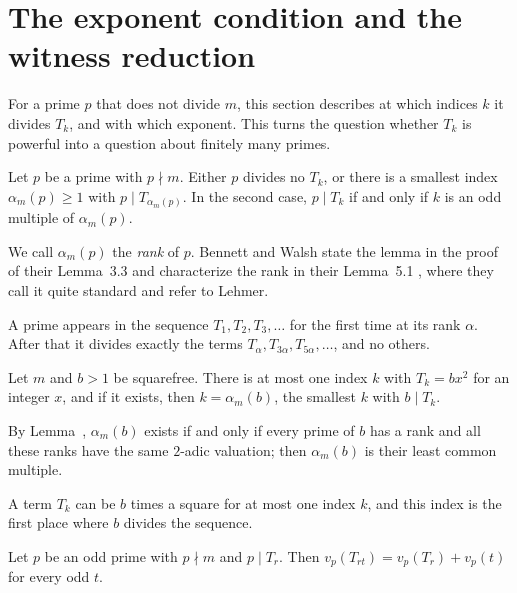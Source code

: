 \section{The exponent condition and the witness reduction}

For a prime $p$ that does not divide $m$, this section describes at which indices $k$ it divides $T_k$, and with which exponent. This
turns the question whether $T_k$ is powerful into a question about finitely many primes.

\begin{lemma}
Let $p$ be a prime with $p \nmid m$. Either $p$ divides no $T_k$, or there is a smallest index $\alpha_m(p) \ge 1$ with
$p \mid T_{\alpha_m(p)}$. In the second case, $p \mid T_k$ if and only if $k$ is an odd multiple of $\alpha_m(p)$.
\end{lemma}

We call $\alpha_m(p)$ the \emph{rank} of $p$. Bennett and Walsh state the lemma in the proof of their Lemma~3.3 and characterize the rank in
their Lemma~5.1 \cite[p.~3486]{BennettWalsh1999}, where they call it quite standard and refer to Lehmer.

\inwords A prime appears in the sequence $T_1, T_2, T_3, \ldots$ for the first time at its rank $\alpha$. After that it divides exactly
the terms $T_{\alpha}, T_{3\alpha}, T_{5\alpha}, \ldots$, and no others.

\begin{lemma}
Let $m$ and $b > 1$ be squarefree. There is at most one index $k$ with $T_k = b x^2$ for an integer $x$, and if it exists, then
$k = \alpha_m(b)$, the smallest $k$ with $b \mid T_k$.
\end{lemma}

By Lemma~, $\alpha_m(b)$ exists if and only if every prime of $b$ has a rank and all these ranks have the same $2$-adic
valuation; then $\alpha_m(b)$ is their least common multiple.

\inwords A term $T_k$ can be $b$ times a square for at most one index $k$, and this index is the first place where $b$ divides the
sequence.

\begin{lemma}
Let $p$ be an odd prime with $p \nmid m$ and $p \mid T_r$. Then $v_p(T_{rt}) = v_p(T_r) + v_p(t)$ for every odd $t$.
\end{lemma}

